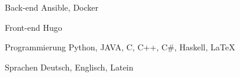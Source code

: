 


\begin{cvskills}

    \cvskill
      {Back-end}
      {Ansible, Docker}

    \cvskill
      {Front-end} %
      {Hugo} %

    \cvskill
      {Programmierung} %
      {Python, JAVA, C, C++, C#, Haskell, \LaTeX} %

    \cvskill
      {Sprachen} %
      {Deutsch, Englisch, Latein} %

\end{cvskills}
